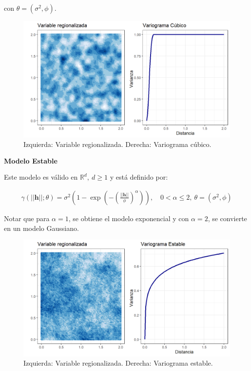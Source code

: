 \documentclass[
]{book}
\begin{document}
con \(\theta=(\sigma^2,\phi)\).

\begin{figure}
\includegraphics[width=17.78in]{figuras/otros/cub_var} \caption{Izquierda: Variable regionalizada. Derecha: Variograma cúbico.}\label{fig:cubvar}
\end{figure}

\textbf{Modelo Estable}

Este modelo es válido en \(\mathbb{R}^d,\ d\geq1\) y está definido por:

\begin{align}
    \gamma(||\textbf{h}||;\theta)=\sigma^2 \left(1-\exp\left(-\left(\frac{||\textbf{h}||}{\phi}\right)^\alpha\right) \right),\quad 0<\alpha \leq 2,\ \theta=(\sigma^2,\phi)
\end{align}

Notar que para \(\alpha=1\), se obtiene el modelo exponencial y con \(\alpha=2\), se convierte en un modelo Gaussiano.

\begin{figure}
\includegraphics[width=17.78in]{figuras/otros/estable_var} \caption{Izquierda: Variable regionalizada. Derecha: Variograma estable.}\label{fig:establevar}
\end{figure}
\end{document}
